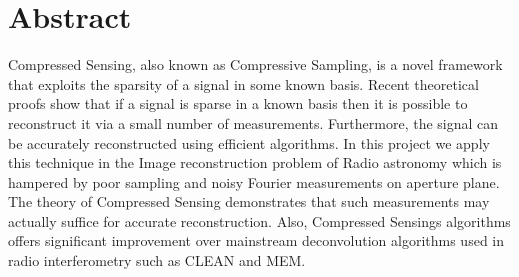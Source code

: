 \chapter*{Abstract}

Compressed Sensing, also known as Compressive Sampling, is a 
novel framework that exploits the sparsity of a signal in some
known basis. Recent theoretical proofs show that if a signal is 
sparse in a known basis then it is possible to reconstruct
it via a small number of measurements. Furthermore, the signal can  
be accurately reconstructed using efficient algorithms. In this project we apply
 this technique in the Image reconstruction problem of Radio astronomy which is 
hampered by poor sampling and noisy Fourier measurements on aperture plane. The 
theory of Compressed Sensing demonstrates that such measurements may actually 
suffice for accurate reconstruction. Also, Compressed Sensings algorithms offers 
significant improvement over mainstream deconvolution algorithms used in radio 
interferometry such as CLEAN and MEM.
